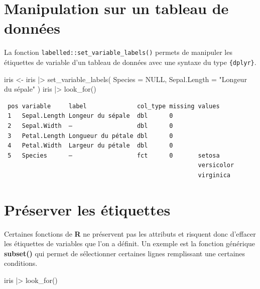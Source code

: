 \documentclass[
  letterpaper,
  DIV=11,
  numbers=noendperiod,
  oneside]{scrreprt}
\newenvironment{Shaded}{\begin{snugshade}}{\end{snugshade}}
\newcommand{\AttributeTok}[1]{\textcolor[rgb]{0.40,0.45,0.13}{#1}}
\newcommand{\ConstantTok}[1]{\textcolor[rgb]{0.56,0.35,0.01}{#1}}
\newcommand{\FunctionTok}[1]{\textcolor[rgb]{0.28,0.35,0.67}{#1}}
\newcommand{\NormalTok}[1]{\textcolor[rgb]{0.00,0.23,0.31}{#1}}
\newcommand{\OtherTok}[1]{\textcolor[rgb]{0.00,0.23,0.31}{#1}}
\newcommand{\SpecialCharTok}[1]{\textcolor[rgb]{0.37,0.37,0.37}{#1}}
\newcommand{\StringTok}[1]{\textcolor[rgb]{0.13,0.47,0.30}{#1}}
\begin{document}
\hypertarget{manipulation-sur-un-tableau-de-donnuxe9es}{%
\section{Manipulation sur un tableau de
données}\label{manipulation-sur-un-tableau-de-donnuxe9es}}

La fonction \texttt{labelled::set\_variable\_labels()} permets de
manipuler les étiquettes de variable d'un tableau de données avec une
syntaxe du type \texttt{\{dplyr\}}.

\begin{Shaded}
\begin{Highlighting}[]
\NormalTok{iris }\OtherTok{\textless{}{-}} 
\NormalTok{  iris }\SpecialCharTok{|\textgreater{}} 
  \FunctionTok{set\_variable\_labels}\NormalTok{(}
    \AttributeTok{Species =} \ConstantTok{NULL}\NormalTok{,}
    \AttributeTok{Sepal.Length =} \StringTok{"Longeur du sépale"}
\NormalTok{  )}
\NormalTok{iris }\SpecialCharTok{|\textgreater{}} 
  \FunctionTok{look\_for}\NormalTok{()}
\end{Highlighting}
\end{Shaded}

\begin{verbatim}
 pos variable     label              col_type missing values    
 1   Sepal.Length Longeur du sépale  dbl      0                 
 2   Sepal.Width  —                  dbl      0                 
 3   Petal.Length Longueur du pétale dbl      0                 
 4   Petal.Width  Largeur du pétale  dbl      0                 
 5   Species      —                  fct      0       setosa    
                                                      versicolor
                                                      virginica 
\end{verbatim}

\hypertarget{pruxe9server-les-uxe9tiquettes}{%
\section{Préserver les
étiquettes}\label{pruxe9server-les-uxe9tiquettes}}

Certaines fonctions de \textbf{R} ne préservent pas les attributs et
risquent donc d'effacer les étiquettes de variables que l'on a définit.
Un exemple est la fonction générique \textbf{subset()} qui permet de
sélectionner certaines lignes remplissant une certaines conditions.

\begin{Shaded}
\begin{Highlighting}[]
\NormalTok{iris }\SpecialCharTok{|\textgreater{}} 
  \FunctionTok{look\_for}\NormalTok{()}
\end{Highlighting}
\end{Shaded}
\end{document}
